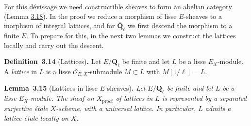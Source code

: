 \documentclass[11pt]{article}
\newenvironment{bpstatement}[2]{\par\addvspace{0.6\baselineskip}\noindent\textbf{#1}#2\textbf{.}\enspace\ignorespaces}
  {\par\addvspace{0.4\baselineskip}}
\newenvironment{bpstatementit}[2]{\begin{bpstatement}{#1}{#2}\itshape\ignorespaces}{\end{bpstatement}}
\begin{document}
For this dévissage we need constructible sheaves to form an abelian category (Lemma \hyperref[bp248]{3.18}). In the proof we reduce a morphism of lisse \(E\)-sheaves to a morphism of integral lattices, and for \(\overline{\mathbf Q}_\ell\) we first descend the morphism to a finite \(E\). To prepare for this, in the next two lemmas we construct the lattices locally and carry out the descent.

\label{bp239}%
\begin{bpstatement}{Definition~3.14}{ (Lattices)}
Let \(E/\mathbf Q_\ell\) be finite and let \(L\) be a lisse \(E_X\)-module. A \emph{lattice} in \(L\) is a lisse \(\mathcal O_{E,X}\)-submodule \(M\subset L\) with \(M[1/\ell]=L\).
\end{bpstatement}

\label{bp240}%
\begin{bpstatementit}{Lemma~3.15}{ (Lattices in lisse $E$-sheaves)}
Let \(E/\mathbf Q_\ell\) be finite and let \(L\) be a lisse \(E_X\)-module. The sheaf on \(X_{\mathrm{pro}\acute{e}t}\) of lattices in \(L\) is represented by a separated surjective étale \(X\)-scheme, with a universal lattice. In particular, \(L\) admits a lattice étale locally on \(X\).
\end{bpstatementit}
\end{document}
